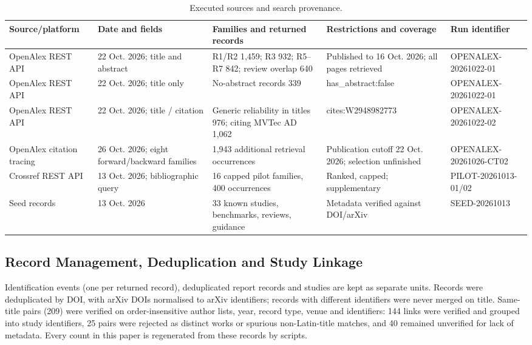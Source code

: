 \documentclass[journal]{IEEEtran}
\begin{document}
\begin{table}[t]
\caption{Executed sources and search provenance.}
\label{tab:searches}
\centering\footnotesize
\begin{tabularx}{\textwidth}{p{}p{}YYp{0.15\textwidth}}
\toprule
Source/platform & Date and fields & Families and returned records & Restrictions and coverage & Run identifier \\
\midrule
OpenAlex REST API & 22 Oct. 2026; title and abstract & R1/R2 1,459; R3 932; R5--R7 842; review overlap 640 & Published to 16 Oct. 2026; all pages retrieved & OPENALEX-20261022-01 \\
OpenAlex REST API & 22 Oct. 2026; title only & No-abstract records 339 & has\_abstract:false & OPENALEX-20261022-01 \\
OpenAlex REST API & 22 Oct. 2026; title / citation & Generic reliability in titles 976; citing MVTec AD 1,062 & cites:W2948982773 & OPENALEX-20261022-02 \\
OpenAlex citation tracing & 26 Oct. 2026; eight forward/backward families & 1,943 additional retrieval occurrences & Publication cutoff 22 Oct. 2026; selection unfinished & OPENALEX-20261026-CT02 \\
Crossref REST API & 13 Oct. 2026; bibliographic query & 16 capped pilot families, 400 occurrences & Ranked, capped; supplementary & PILOT-20261013-01/02 \\
Seed records & 13 Oct. 2026 & 33 known studies, benchmarks, reviews, guidance & Metadata verified against DOI/arXiv & SEED-20261013 \\
\bottomrule
\end{tabularx}
\end{table}

\subsection{Record Management, Deduplication and Study Linkage}
Identification events (one per returned record), deduplicated report records and studies are kept as separate units. Records were deduplicated by DOI, with arXiv DOIs normalised to arXiv identifiers; records with different identifiers were never merged on title. Same-title pairs (209) were verified on order-insensitive author lists, year, record type, venue and identifiers: 144 links were verified and grouped into study identifiers, 25 pairs were rejected as distinct works or spurious non-Latin-title matches, and 40 remained unverified for lack of metadata. Every count in this paper is regenerated from these records by scripts.
\end{document}
